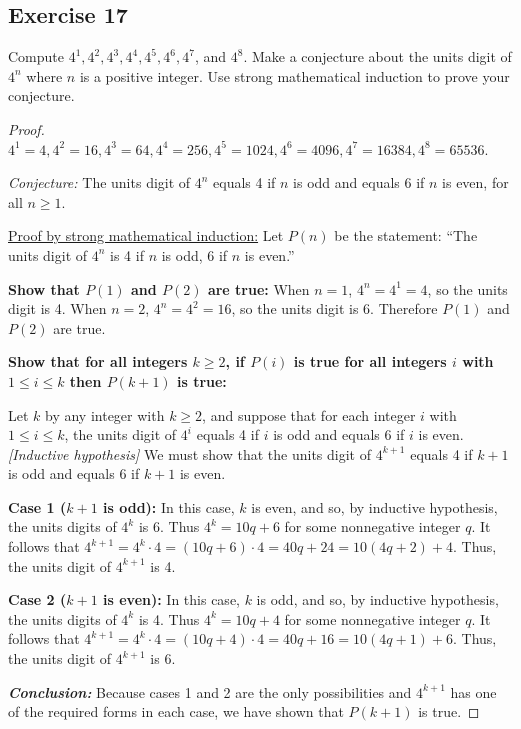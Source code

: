 \documentclass[14pt]{extarticle}
\begin{document}
\subsection{Exercise 17}
Compute $4^1, 4^2, 4^3, 4^4, 4^5, 4^6, 4^7$, and $4^8$.
Make a conjecture about the units digit of $4^n$ where $n$ is a positive integer.
Use strong mathematical induction to prove your conjecture.

\begin{proof}
    $4^1 = 4, 4^2 = 16, 4^3 = 64, 4^4 = 256, 4^5 = 1024, 4^6 = 4096, 4^7 = 16384, 4^8 = 65536$.

        {\it Conjecture:}
    The units digit of $4^n$ equals 4 if $n$ is odd and equals 6 if $n$ is even,
    for all $n \geq 1$.

    \underline{Proof by strong mathematical induction:}
    Let $P(n)$ be the statement:
    ``The units digit of $4^n$ is 4 if $n$ is odd, 6 if $n$ is even.''

    {\bf Show that $P(1)$ and $P(2)$ are true:}
    When $n = 1$, $4^n = 4^1 = 4$, so the units digit is 4.
    When $n = 2$, $4^n = 4^2 = 16$, so the units digit is 6.
    Therefore $P(1)$ and $P(2)$ are true.

        {\bf Show that for all integers $k \geq 2$, if $P(i)$ is true for all integers $i$ with $1 \leq i \leq k$ then $P(k+1)$ is true:}

    Let $k$ by any integer with $k \geq 2$, and suppose that for each integer $i$
    with $1 \leq i \leq k$, the units digit of $4^i$ equals 4 if $i$ is odd and
    equals 6 if $i$ is even. {\it [Inductive hypothesis]}
    We must show that the units digit of $4^{k+1}$ equals 4
    if $k + 1$ is odd and equals 6 if $k + 1$ is even.

        {\bf Case 1 ($k + 1$ is odd):} In this case, $k$ is even,
    and so, by inductive hypothesis, the units digits of $4^k$ is 6.
    Thus $4^k = 10q + 6$ for some nonnegative integer $q$. It follows that
    $4^{k+1} = 4^k \cdot 4 = (10q + 6) \cdot 4 = 40q + 24 = 10(4q + 2) + 4$.
    Thus, the units digit of $4^{k+1}$ is 4.

        {\bf Case 2 ($k + 1$ is even):} In this case, $k$ is odd,
    and so, by inductive hypothesis, the units digits of $4^k$ is 4.
    Thus $4^k = 10q + 4$ for some nonnegative integer $q$. It follows that
    $4^{k+1} = 4^k \cdot 4 = (10q + 4) \cdot 4 = 40q + 16 = 10(4q + 1) + 6$.
    Thus, the units digit of $4^{k+1}$ is 6.

        {\bf\it Conclusion:} Because cases 1 and 2 are the only
    possibilities and $4^{k+1}$ has one of the required forms
    in each case, we have shown that $P(k + 1)$ is true.
\end{proof}
\end{document}
